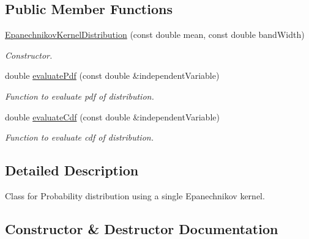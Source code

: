 \subsection*{Public Member Functions}
\begin{DoxyCompactItemize}
\item 
\hyperlink{classtudat_1_1statistics_1_1EpanechnikovKernelDistribution_a4ff2b8492862b80c9cf51dc9ca30c881}{Epanechnikov\+Kernel\+Distribution} (const double mean, const double band\+Width)
\begin{DoxyCompactList}\small\item\em Constructor. \end{DoxyCompactList}\item 
double \hyperlink{classtudat_1_1statistics_1_1EpanechnikovKernelDistribution_ad4ef6494dd02a5efae26ffe69e1f8008}{evaluate\+Pdf} (const double \&independent\+Variable)
\begin{DoxyCompactList}\small\item\em Function to evaluate pdf of distribution. \end{DoxyCompactList}\item 
double \hyperlink{classtudat_1_1statistics_1_1EpanechnikovKernelDistribution_a168c6dc6cec1b90c5eb98fc04509a980}{evaluate\+Cdf} (const double \&independent\+Variable)
\begin{DoxyCompactList}\small\item\em Function to evaluate cdf of distribution. \end{DoxyCompactList}\end{DoxyCompactItemize}


\subsection{Detailed Description}
Class for Probability distribution using a single Epanechnikov kernel. 

\subsection{Constructor \& Destructor Documentation}
